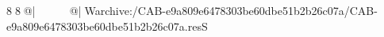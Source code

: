 8  8  @|                                                   @| W   archive:/CAB-e9a809e6478303be60dbe51b2b26c07a/CAB-e9a809e6478303be60dbe51b2b26c07a.resS 